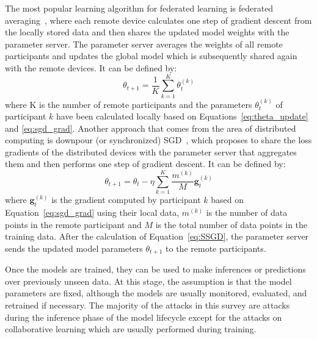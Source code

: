The most popular learning algorithm for federated learning is federated averaging~, where each remote device calculates one step of gradient descent from the locally stored data and then shares the updated model weights with the parameter server. The parameter server averages the weights of all remote participants and updates the global model which is subsequently shared again with the remote devices. It can be defined by:
\begin{equation}
    \label{eq:fed_avg}
    \theta_{t+1} = \frac{1}{K} \sum_{k=1}^{K} \theta_{t}^{(k)} 
\end{equation}
where K is the number of remote participants and the parameters $\theta_{t}^{(k)}$ of participant $k$ have been calculated locally based on Equations~\ref{eq:theta_update} and \ref{eq:sgd_grad}. 
Another approach that comes from the area of distributed computing is downpour (or synchronized) SGD~, which proposes to share the loss gradients of the distributed devices with the parameter server that aggregates them and then performs one step of gradient descent. It can be defined by:
\begin{equation}
    \label{eq:SSGD}
    \theta_{t+1} = \theta_{t} - \eta \sum_{k=1}^{K} \frac{m^{(k)}}{M}\mathbf{g}_t^{(k)}
\end{equation}
where $\mathbf{g}_t^{(k)}$ is the gradient computed by participant $k$ based on Equation~\ref{eq:sgd_grad} using their local data, $m^{(k)}$ is the number of data points in the remote participant and $M$ is the total number of data points in the training data. After the calculation of Equation~\ref{eq:SSGD}, the parameter server sends the updated model parameters $\theta_{t+1}$ to the remote participants.

Once the models are trained, they can be used to make inferences or predictions over previously unseen data. At this stage, the assumption is that the model parameters are fixed, although the models are usually monitored, evaluated, and retrained if necessary. The majority of the attacks in this survey are attacks during the inference phase of the model lifecycle except for the attacks on collaborative learning which are usually performed during training.

